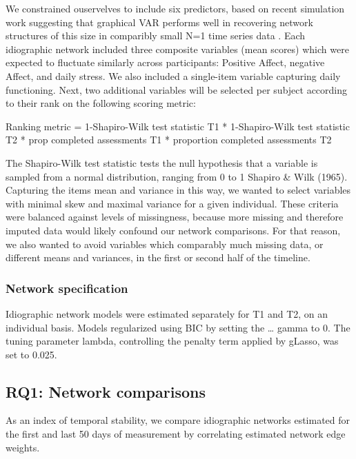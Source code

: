 \documentclass[
  english,
  man]{apa6}
\begin{document}
We constrained ouservelves to include six predictors, based on recent simulation work suggesting that graphical VAR performs well in recovering network structures of this size in comparibly small N=1 time series data .
Each idiographic network included three composite variables (mean scores) which were expected to fluctuate similarly across participants: Positive Affect, negative Affect, and daily stress.
We also included a single-item variable capturing daily functioning.
Next, two additional variables will be selected per subject according to their rank on the following scoring metric:

Ranking metric = 1-Shapiro-Wilk test statistic T1 * 1-Shapiro-Wilk test statistic T2 * prop completed assessments T1 * proportion completed assessments T2

The Shapiro-Wilk test statistic tests the null hypothesis that a variable is sampled from a normal distribution, ranging from 0 to 1 Shapiro \& Wilk (1965).
Capturing the items mean and variance in this way, we wanted to select variables with minimal skew and maximal variance for a given individual.
These criteria were balanced against levels of missingness, because more missing and therefore imputed data would likely confound our network comparisons.
For that reason, we also wanted to avoid variables which comparably much missing data, or different means and variances, in the first or second half of the timeline.

\hypertarget{network-specification}{%
\subsubsection{Network specification}\label{network-specification}}

Idiographic network models were estimated separately for T1 and T2, on an individual basis.
Models regularized using BIC by setting the \ldots{} gamma to 0.
The tuning parameter lambda, controlling the penalty term applied by gLasso, was set to 0.025.

\hypertarget{rq1-network-comparisons}{%
\subsection{RQ1: Network comparisons}\label{rq1-network-comparisons}}

As an index of temporal stability, we compare idiographic networks estimated for the first and last 50 days of measurement by correlating estimated network edge weights.
\end{document}
